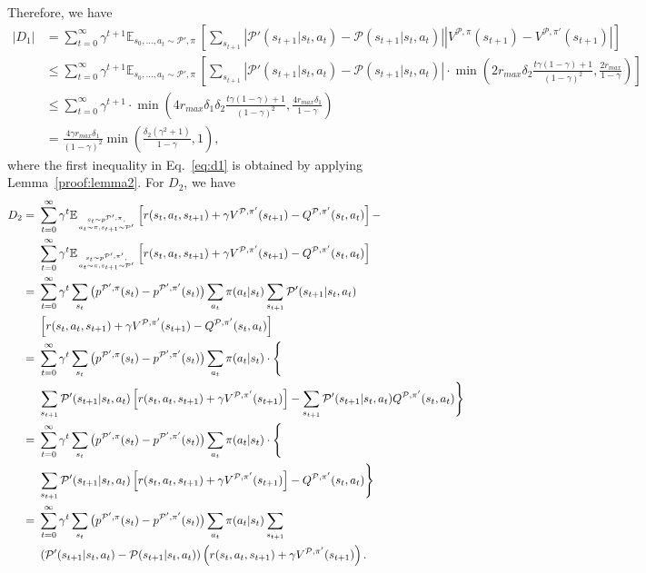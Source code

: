 \documentclass[letterpaper]{article} %
\def\E{{\mathbb{E}}}
\def\P{{\mathcal{P}}}
\begin{document}
Therefore, we have
{\small
\begin{align}
|D_1|&=\sum_{t=0}^{\infty}\gamma^{t+1}\E_{s_0,\ldots, a_t\sim \P', \pi}\ 
\left[
\sum_{s_{t+1}}\left|\P'(s_{t+1}|s_t,a_t)-\P(s_{t+1}|s_t,a_t)\right|
\left|
V^{\P,\pi}(s_{t+1})-V^{\P,\pi'}(s_{t+1})
\right|
\right]
\nonumber
\\
&\leq\sum_{t=0}^{\infty}\gamma^{t+1}\E_{s_0,\ldots, a_t\sim \P', \pi}\ 
\left[
\sum_{s_{t+1}}\left|\P'(s_{t+1}|s_t,a_t)-\P(s_{t+1}|s_t,a_t)\right|\cdot
\min\left(2r_{max}\delta_2\frac{t\gamma(1-\gamma)+1}{(1-\gamma)^2}, \frac{2r_{max}}{1-\gamma}\right)
\right]
\nonumber
\\
&\leq\sum_{t=0}^\infty\gamma^{t+1}\cdot
\min\left(4r_{max}\delta_1\delta_2\frac{t\gamma(1-\gamma)+1}{(1-\gamma)^2}, \frac{4r_{max}\delta_1}{1-\gamma}\right)
\nonumber
\\
&=
\frac{4\gamma r_{max}\delta_1}{(1-\gamma)^2}
\min\left(
\frac{\delta_2(\gamma^2+1)}{1-\gamma}, 1
\right),
\label{eq:d1}
\end{align}
}\noindent
where the first inequality in Eq.~\eqref{eq:d1} is obtained by applying Lemma~\ref{proof:lemma2}.
For $D_2$, we have
{\small
\begin{align*}
D_2=\ 
&\sum_{t=0}^{\infty}\gamma^t
\E_{s_t\sim p^{\P',\pi}, \atop {a_t\sim\pi, s_{t+1}\sim\P'}}
\left[
r(s_t,a_t,s_{t+1})+\gamma V^{\P, {\pi'}}(s_{t+1})-Q^{\P, {\pi'}}(s_t,a_t)
\right]
-
\\
&\sum_{t=0}^{\infty}\gamma^t
\E_{s_t\sim p^{\P',\pi'}, \atop {a_t\sim\pi, s_{t+1}\sim\P'}}
\left[
r(s_t,a_t,s_{t+1})+\gamma V^{\P, {\pi'}}(s_{t+1})-Q^{\P, {\pi'}}(s_t,a_t)
\right]
\\
=\ 
&\sum_{t=0}^{\infty}\gamma^t
\sum_{s_t}\big(p^{\P',\pi}(s_t)-p^{\P',\pi'}(s_t)\big)
\sum_{a_t}\pi(a_t|s_t)
\sum_{s_{t+1}}\P'(s_{t+1}|s_t,a_t)
\\
&\left[
r(s_t,a_t,s_{t+1})+\gamma V^{\P, {\pi'}}(s_{t+1})-Q^{\P, {\pi'}}(s_t,a_t)
\right]
\\
=\ 
&\sum_{t=0}^{\infty}\gamma^t
\sum_{s_t}\big(p^{\P',\pi}(s_t)-p^{\P',\pi'}(s_t)\big)
\sum_{a_t}\pi(a_t|s_t)\cdot\Bigg\{
\\
&\sum_{s_{t+1}}\P'(s_{t+1}|s_t,a_t)
\left[
r(s_t,a_t,s_{t+1})+\gamma V^{\P, {\pi'}}(s_{t+1})
\right]
-
\sum_{s_{t+1}}\P'(s_{t+1}|s_t,a_t)
Q^{\P, {\pi'}}(s_t,a_t)
\Bigg\}
\\
=\ 
&\sum_{t=0}^{\infty}\gamma^t
\sum_{s_t}\big(p^{\P',\pi}(s_t)-p^{\P',\pi'}(s_t)\big)
\sum_{a_t}\pi(a_t|s_t)\cdot\Bigg\{
\\
&\sum_{s_{t+1}}\P'(s_{t+1}|s_t,a_t)
\left[
r(s_t,a_t,s_{t+1})+\gamma V^{\P, {\pi'}}(s_{t+1})
\right]
-
Q^{\P, {\pi'}}(s_t,a_t)
\Bigg\}
\\
=\ 
&\sum_{t=0}^{\infty}\gamma^t
\sum_{s_t}\big(p^{\P',\pi}(s_t)-p^{\P',\pi'}(s_t)\big)
\sum_{a_t}\pi(a_t|s_t)
\sum_{s_{t+1}}
\\
&\left(\P'(s_{t+1}|s_t,a_t)-\P(s_{t+1}|s_t,a_t)\right)
\left(r(s_t,a_t,s_{t+1})+\gamma V^{\P, {\pi'}}(s_{t+1})\right).
\end{align*}
}\noindent
\end{document}
